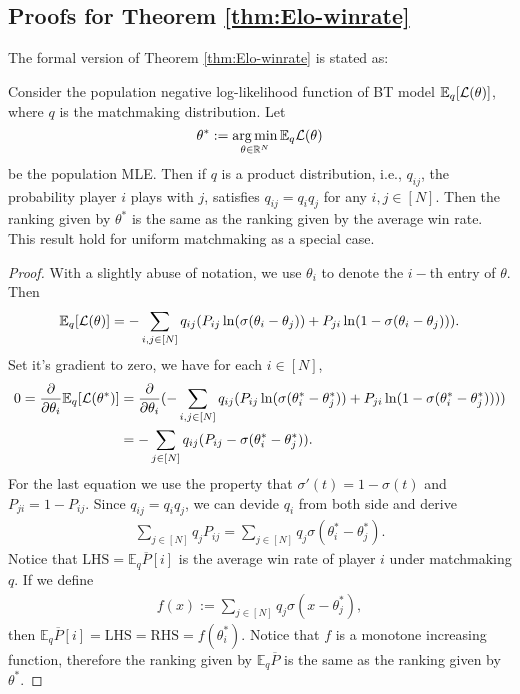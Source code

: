\subsection{Proofs for Theorem \ref{thm:Elo-winrate}}
\label{proof:thm:Elo-winrate} 
The formal version of Theorem \ref{thm:Elo-winrate} is stated as:
\begin{theorem}
Consider the population negative log-likelihood function of BT model $\mathbb{E}_{q} [\mathcal{L}(\theta)]$,
where $q$ is the matchmaking distribution. Let \begin{equation*}
\theta^* := \operatorname*{arg\,min}_{\theta\in\mathbb{R}^N}\mathbb{E}_{q}\mathcal{L}(\theta)
\end{equation*}  
be the population MLE. Then if $q$ is a product distribution, i.e., $q_{ij}$, the probability player $i$ plays with $j$, satisfies $q_{ij}=q_i q_j$ for any $i,j \in[N]$. Then the ranking given by $\theta^*$ is the same as the ranking given by the average win rate. This result hold for uniform matchmaking as a special case.

\begin{proof}
With a slightly abuse of notation, we use $\theta_i$ to denote the $i-$th entry of $\theta$.  Then
\begin{align*}
  \mathbb{E}_{q} [\mathcal{L}(\theta)]  = -\sum_{i,j \in [N]} q_{ij} (P_{ij}\ln (\sigma(\theta_i-\theta_j)) + P_{ji}\ln (1-\sigma(\theta_i-\theta_j))).
\end{align*}
Set it's gradient to zero, we have for each $i \in [N]$,
\begin{align*}
  0=\frac{\partial}{\partial \theta_i}\mathbb{E}_{q} [\mathcal{L}(\theta^*)]  &= \frac{\partial}{\partial \theta_i} (-\sum_{i,j \in [N]} q_{ij} (P_{ij}\ln (\sigma(\theta^*_i-\theta^*_j)) + P_{ji}\ln (1-\sigma(\theta^*_i-\theta^*_j))) ) \\
  &= -\sum_{j \in [N]} q_{ij} (P_{ij} - \sigma(\theta^*_i -\theta^*_j)).
\end{align*}
For the last equation we use the property that $\sigma'(t)=1-\sigma(t)$ and $P_{ji}=1-P_{ij}$. Since $q_{ij}=q_i q_j$, we can devide $q_i$ from both side and derive
\begin{align*}
    \sum_{j \in [N]}q_j P_{ij} =\sum_{j \in [N]}q_j \sigma(\theta^*_{i} - \theta^*_{j}).
\end{align*}
Notice that $\text{LHS}=\mathbb{E}_{q}\overline{P}[i]$ is the average win rate of player $i$ under matchmaking $q$. If we define 
\begin{align*}
    f(x):=\sum_{j \in [N]}q_j \sigma(x - \theta^*_{j}),
\end{align*}
then $\mathbb{E}_{q}\overline{P}[i]=\text{LHS}=\text{RHS}=f(\theta^*_{i})$. Notice that $f$ is a monotone increasing function, therefore the ranking given by $\mathbb{E}_{q} \overline{P}$ is the same as the ranking given by $\theta^*$. 
\end{proof}

\end{theorem}


